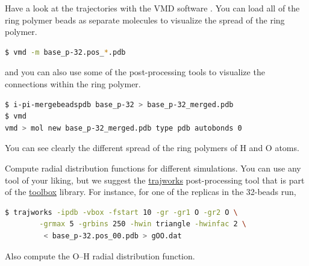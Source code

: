 \documentclass{article}
\begin{document}
\begin{Exercise}[label={basic},title={A PIMD simulation of liquid water}]
\Question
Have a look at the trajectories with the VMD software 
. 
You can load all of the ring polymer beads as separate molecules to visualize the
spread of the ring polymer.
\begin{lstlisting}[language=bash]
$ vmd -m base_p-32.pos_*.pdb 
\end{lstlisting}%
and you can also use some of the \ipi{} post-processing tools to visualize
the connections within the ring polymer. 
\begin{lstlisting}[language=bash]
$ i-pi-mergebeadspdb base_p-32 > base_p-32_merged.pdb
$ vmd
vmd > mol new base_p-32_merged.pdb type pdb autobonds 0
\end{lstlisting}
You can see clearly the different spread of the ring polymers of H and O atoms.

\Question
Compute radial distribution functions for different simulations. You
can use any tool of your liking, but we suggest the \url{trajworks} 
post-processing tool that is part of the \url{toolbox} library.
For instance, for one of the replicas in the 32-beads run,
\begin{lstlisting}[language=bash]
$ trajworks -ipdb -vbox -fstart 10 -gr -gr1 O -gr2 O \
        -grmax 5 -grbins 250 -hwin triangle -hwinfac 2 \
         < base_p-32.pos_00.pdb > gOO.dat
\end{lstlisting}%
Also compute the O--H radial distribution function.

\end{Exercise}
\end{document}

